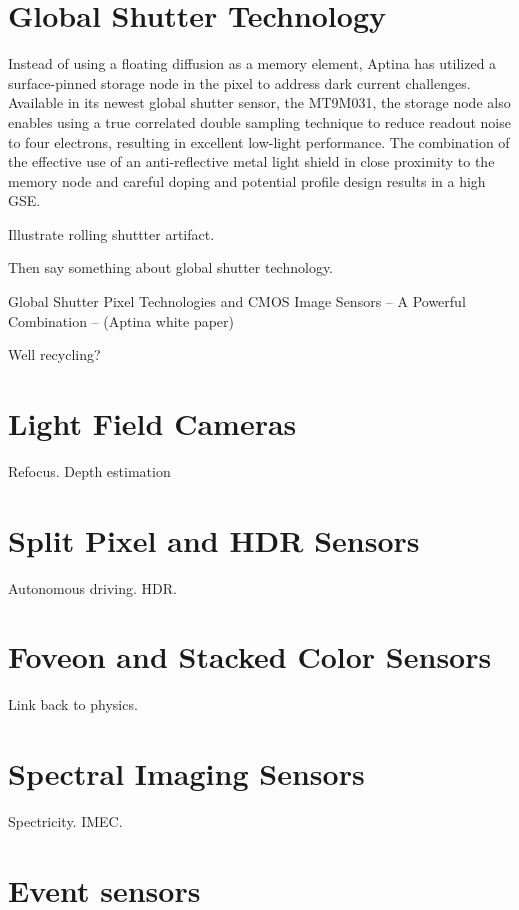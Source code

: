 \documentclass[
  letterpaper,
]{book}
\begin{document}
\section{Global Shutter Technology}\label{sec-sensor-globalshutter}

Instead of using a floating diffusion as a memory element, Aptina has
utilized a surface-pinned storage node in the pixel to address dark
current challenges. Available in its newest global shutter sensor, the
MT9M031, the storage node also enables using a true correlated double
sampling technique to reduce readout noise to four electrons, resulting
in excellent low-light performance. The combination of the effective use
of an anti-reflective metal light shield in close proximity to the
memory node and careful doping and potential profile design results in a
high GSE.

Illustrate rolling shuttter artifact.

Then say something about global shutter technology.

Global Shutter Pixel Technologies and CMOS Image Sensors -- A Powerful
Combination -- (Aptina white paper)

Well recycling?

\section{Light Field Cameras}\label{sec-sensor-lightfield}

Refocus. Depth estimation

\section{Split Pixel and HDR Sensors}\label{sec-sensor-splitpixel}

Autonomous driving. HDR.

\section{Foveon and Stacked Color Sensors}\label{sec-sensor-foveon}

Link back to physics.

\section{Spectral Imaging Sensors}\label{sec-sensor-spectral}

Spectricity. IMEC.

\section{Event sensors}\label{sec-sensor-event}
\end{document}
